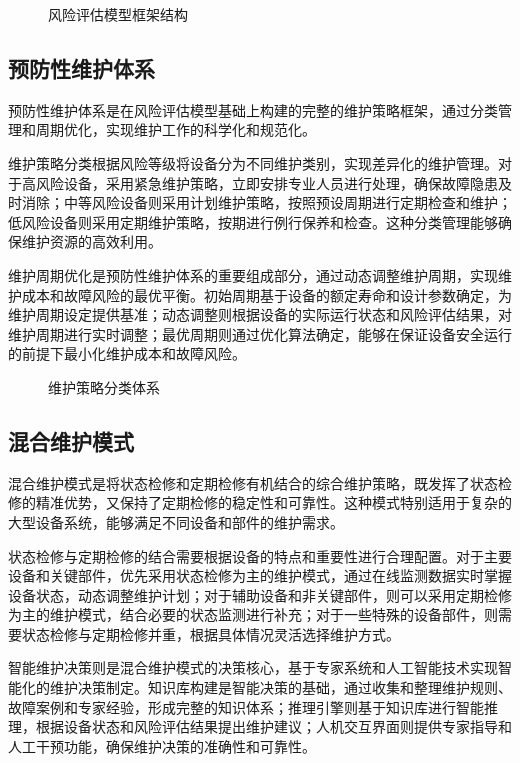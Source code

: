 \begin{figure}[h]
\centering
\caption{风险评估模型框架结构}
\label{fig:risk_assessment_model}
\end{figure}

\subsection{预防性维护体系}

预防性维护体系是在风险评估模型基础上构建的完整的维护策略框架，通过分类管理和周期优化，实现维护工作的科学化和规范化。

维护策略分类根据风险等级将设备分为不同维护类别，实现差异化的维护管理。对于高风险设备，采用紧急维护策略，立即安排专业人员进行处理，确保故障隐患及时消除；中等风险设备则采用计划维护策略，按照预设周期进行定期检查和维护；低风险设备则采用定期维护策略，按期进行例行保养和检查。这种分类管理能够确保维护资源的高效利用。

维护周期优化是预防性维护体系的重要组成部分，通过动态调整维护周期，实现维护成本和故障风险的最优平衡。初始周期基于设备的额定寿命和设计参数确定，为维护周期设定提供基准；动态调整则根据设备的实际运行状态和风险评估结果，对维护周期进行实时调整；最优周期则通过优化算法确定，能够在保证设备安全运行的前提下最小化维护成本和故障风险。

\begin{figure}[h]
\centering
\caption{维护策略分类体系}
\label{fig:maintenance_strategy_classification}
\end{figure}

\subsection{混合维护模式}

混合维护模式是将状态检修和定期检修有机结合的综合维护策略，既发挥了状态检修的精准优势，又保持了定期检修的稳定性和可靠性。这种模式特别适用于复杂的大型设备系统，能够满足不同设备和部件的维护需求。

状态检修与定期检修的结合需要根据设备的特点和重要性进行合理配置。对于主要设备和关键部件，优先采用状态检修为主的维护模式，通过在线监测数据实时掌握设备状态，动态调整维护计划；对于辅助设备和非关键部件，则可以采用定期检修为主的维护模式，结合必要的状态监测进行补充；对于一些特殊的设备部件，则需要状态检修与定期检修并重，根据具体情况灵活选择维护方式。

智能维护决策则是混合维护模式的决策核心，基于专家系统和人工智能技术实现智能化的维护决策制定。知识库构建是智能决策的基础，通过收集和整理维护规则、故障案例和专家经验，形成完整的知识体系；推理引擎则基于知识库进行智能推理，根据设备状态和风险评估结果提出维护建议；人机交互界面则提供专家指导和人工干预功能，确保维护决策的准确性和可靠性。

